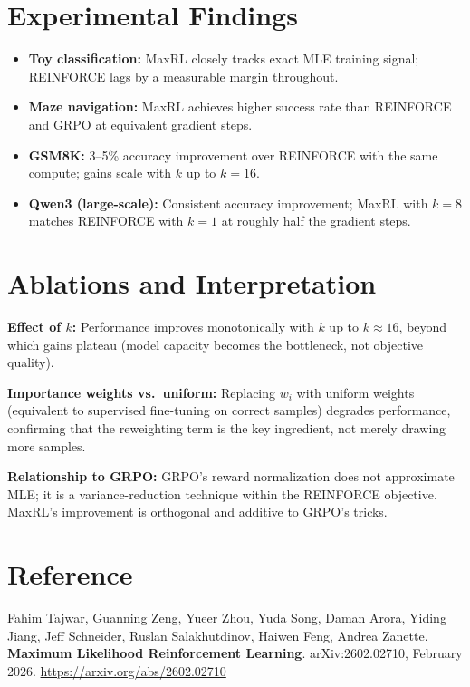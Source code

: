 \documentclass[10pt,twocolumn]{article}
\begin{document}
\section{Experimental Findings}

\begin{itemize}[itemsep=2pt,parsep=0pt]
  \item \textbf{Toy classification:} MaxRL closely tracks exact MLE training
    signal; REINFORCE lags by a measurable margin throughout.
  \item \textbf{Maze navigation:} MaxRL achieves higher success rate than
    REINFORCE and GRPO at equivalent gradient steps.
  \item \textbf{GSM8K:} 3--5\% accuracy improvement over REINFORCE with
    the same compute; gains scale with $k$ up to $k = 16$.
  \item \textbf{Qwen3 (large-scale):} Consistent accuracy improvement;
    MaxRL with $k=8$ matches REINFORCE with $k=1$ at roughly half the
    gradient steps.
\end{itemize}

\section{Ablations and Interpretation}

\textbf{Effect of $k$:} Performance improves monotonically with $k$ up to
$k \approx 16$, beyond which gains plateau (model capacity becomes the
bottleneck, not objective quality).

\textbf{Importance weights vs.\ uniform:} Replacing $w_i$ with uniform
weights (equivalent to supervised fine-tuning on correct samples) degrades
performance, confirming that the reweighting term is the key ingredient,
not merely drawing more samples.

\textbf{Relationship to GRPO:} GRPO's reward normalization does not
approximate MLE; it is a variance-reduction technique within the REINFORCE
objective. MaxRL's improvement is orthogonal and additive to GRPO's tricks.

\section*{Reference}

Fahim Tajwar, Guanning Zeng, Yueer Zhou, Yuda Song, Daman Arora,
Yiding Jiang, Jeff Schneider, Ruslan Salakhutdinov, Haiwen Feng,
Andrea Zanette. \textbf{Maximum Likelihood Reinforcement Learning}.
arXiv:2602.02710, February 2026.
\url{https://arxiv.org/abs/2602.02710}
\end{document}
